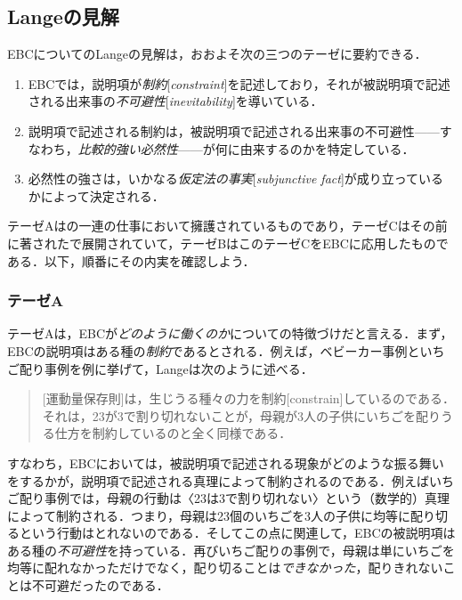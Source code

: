 \documentclass[dvipdfmx,twoside,11pt,uplatex]{jsarticle}
\newcommand{\myterm}[2]{{\emph{#1}}{[\emph{#2}]}}
\theoremstyle{definition}
\begin{document}
\subsection{Langeの見解}\label{langesview}
EBCについてのLangeの見解は，おおよそ次の三つのテーゼに要約できる．
\begin{enumerate}
\renewcommand{\labelenumi}{\Alph{enumi}.}
    \item EBCでは，説明項が\myterm{制約}{constraint}を記述しており，それが被説明項で記述される出来事の\myterm{不可避性}{inevitability}を導いている．
    \item 説明項で記述される制約は，被説明項で記述される出来事の不可避性------すなわち，\emph{比較的強い必然性}------が何に由来するのかを特定している．
    \item 必然性の強さは，いかなる\myterm{仮定法の事実}{subjunctive fact}が成り立っているかによって決定される．
\end{enumerate}
テーゼAは\cite{lange2011const,lange2012sweep,lange2013dme,Lange2018bwcsum}の一連の仕事において擁護されているものであり，テーゼCはその前に著された\cite{lange2009lawmakers}で展開されていて，テーゼBはこのテーゼCをEBCに応用したものである．以下，順番にその内実を確認しよう．

\subsubsection{テーゼA}\label{a}
テーゼAは，EBCが\emph{どのように働くのか}についての特徴づけだと言える．まず，EBCの説明項はある種の\emph{制約}であるとされる．例えば，ベビーカー事例といちご配り事例を例に挙げて，Langeは次のように述べる．
\begin{quote}
    [運動量保存則]は，生じうる種々の力を制約[constrain]しているのである．それは，23が3で割り切れないことが，母親が3人の子供にいちごを配りうる仕方を制約しているのと全く同様である．\citep[17]{Lange2018bwcsum}
\end{quote}
すなわち，EBCにおいては，被説明項で記述される現象がどのような振る舞いをするかが，説明項で記述される真理によって制約されるのである．例えばいちご配り事例では，母親の行動は〈23は3で割り切れない〉という（数学的）真理によって制約される．つまり，母親は23個のいちごを3人の子供に均等に配り切るという行動はとれないのである．そしてこの点に関連して，EBCの被説明項はある種の\emph{不可避性}を持っている．再びいちご配りの事例で，母親は単にいちごを均等に配れなかっただけでなく，配り切ることは\emph{できなかった}，配りきれないことは不可避だったのである．
\end{document}
